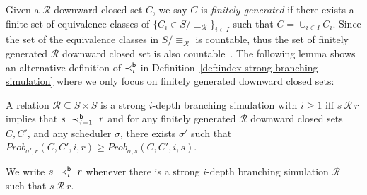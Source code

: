 \documentclass{LMCS}
\newcommand{\iBSi}[1]{\prec_{#1}^{{\sf b}}}
\newcommand{\MC}[1]{\mathcal{#1}}
\newcommand{\MEASURE}{\mathit{Prob}}
\begin{document}
Given a $\MC{R}$ downward closed set $C$, we say $C$ is \emph{finitely generated} if there exists a finite set of equivalence classes of $\{ C_i\in S/\equiv_{\MC{R}}\}_{i\in I}$ such that $C=\cup_{i\in I}C_i$. Since the set of the equivalence classes in $S/\equiv_{\MC{R}}$ is countable, thus the set of finitely generated $\MC{R}$ downward closed set is also countable~\cite{HermannsPSWZ11}. The following lemma shows an alternative definition of $\iBSi{i}$ in Definition~\ref{def:index strong branching simulation} where we only focus on finitely generated downward closed sets:
\begin{lem}\label{lem:finitely generated}
A relation $\MC{R}\subseteq S\times S$ is a
strong $i$-depth branching simulation with $i\geq1$ iff $s~\MC{R}~r$ implies that $s~\iBSi{i-1}~r$ and for any finitely generated $\MC{R}$ downward closed sets $C, C'$, and any scheduler $\sigma$, there exists $\sigma'$ such that $\MEASURE_{\sigma',r}(C,C',i,r)\geq\MEASURE_{\sigma,s}(C,C',i,s)$.

We write $s~\iBSi{i}~r$ whenever there is a strong $i$-depth branching simulation $\MC{R}$ such that $s~\MC{R}~r$.
\end{lem}
\end{document}
